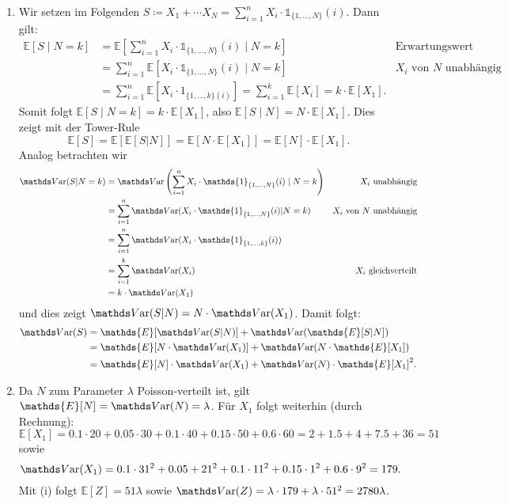 \documentclass[a4paper]{article}
\begin{document}
\begin{enumerate}
    \item Wir setzen im Folgenden $S \coloneq X_1 + \cdots X_N = \sum_{i = 1}^n X_i \cdot \mathds{1}_{\{1, \dots, N\}}(i)$. Dann gilt:
    \begin{align*}
        \mathds{E}[S \mid N = k]
        &= \mathds{E} \left[ \sum_{i = 1}^n X_i \cdot \mathds{1}_{\{1, \dots, N\}}(i) \mid N = k  \right]& \text{Erwartungswert linear}\\
        &= \sum_{i = 1}^n \mathds{E}[X_i \cdot \mathds{1}_{\{1, \dots, N\}}(i) \mid N = k] &\text{$X_i$ von $N$ unabhängig} \\
        &= \sum_{i = 1}^{n} \mathds{E}[X_i \cdot 1_{\{1, \dots, k\}(i)}] = \sum_{i = 1}^k \mathds{E}[X_i] = k \cdot \mathds{E}[X_1]\text{.}
    \end{align*}
    Somit folgt $\mathds{E}[S \mid N = k] = k \cdot \mathds{E}[X_1]$, also $\mathds{E}[S \mid N] = N \cdot \mathds{E}[X_1]$.
    Dies zeigt mit der Tower-Rule
    \begin{equation*}
        \mathds{E}[S] = \mathds{E}[\mathds{E}[S|N]] = \mathds{E}[N \cdot \mathds{E}[X_1]] = \mathds{E}[N] \cdot \mathds{E}[X_1]\text{.}
    \end{equation*}
    Analog betrachten wir
    \begin{align*}
        \var(S|N = k) 
        &= \var\left(\sum_{i = 1}^n X_i \cdot \mathds{1}_{\{1, \dots, N\}}(i) \mid N = k\right) &\text{$X_i$ unabhängig}\\
        &= \sum_{i = 1}^n \var(X_i \cdot \mathds{1}_{\{1, \dots, N\}}(i) | N = k) &\text{$X_i$ von $N$ unabhängig} \\
        &= \sum_{i = 1}^n \var(X_i \cdot \mathds{1}_{\{1, \dots, k\}}(i))\\
        &= \sum_{i = 1}^{k} \var(X_i) & \text{$X_i$ gleichverteilt}\\
        &= k \cdot \var(X_1)
    \end{align*}
    und dies zeigt $\var(S|N) = N \cdot \var(X_1)$. Damit folgt:
    \begin{align*}
        \var(S) &= \mathds{E}[\var(S|N)] + \var(\mathds{E}[S|N]) \\
        &= \mathds{E}[N \cdot \var(X_1)] + \var(N \cdot \mathds{E}[X_1]) \\
        &= \mathds{E}[N] \cdot \var(X_1) + \var(N) \cdot \mathds{E}[X_1]^2\text{.}
    \end{align*}
    \item Da $N$ zum Parameter $\lambda$ Poisson-verteilt ist, gilt $\mathds{E}[N] = \var(N) = \lambda$.
    Für $X_1$ folgt weiterhin (durch Rechnung):
    \begin{equation*}
        \mathds{E}[X_1] = 0.1 \cdot 20 + 0.05 \cdot 30 + 0.1 \cdot 40 + 0.15 \cdot 50 + 0.6 \cdot 60 = 2 + 1.5 + 4 + 7.5 + 36 = 51
    \end{equation*}
    sowie
    \begin{equation*}
        \var(X_1) = 0.1 \cdot 31^2 + 0.05 + 21^2 + 0.1 \cdot 11^2 + 0.15 \cdot 1^2 + 0.6 \cdot 9^2 = 179\text{.}
    \end{equation*}
    Mit (i) folgt $\mathds{E}[Z] = 51\lambda$ sowie $\var(Z) = \lambda \cdot 179 + \lambda \cdot 51^2 = 2780\lambda$.
\end{enumerate}
\end{document}

